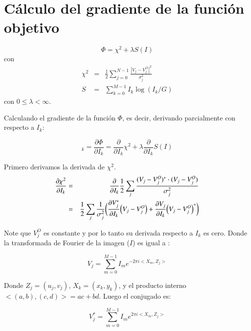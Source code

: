 \chapter{Cálculo del gradiente de la función objetivo}
\label{apendice:dphi}
\begin{equation}
\Phi = \chi^2 + \lambda S(I)
\end{equation}
con
\begin{eqnarray}
\chi^2 & = & \frac{1}{2}\sum^{N-1}_{j=0}{\frac{|V_{j} - V_{j}^{O}|^{2}}{\sigma_j^{2}}} \\
S & = & \sum^{M-1}_{k=0}{I_{k}\log{(I_{k}/G)}}
\end{eqnarray}
con $0 \leq \lambda < \infty$.

Calculando el gradiente de la función $\Phi$, es decir, derivando parcialmente con respecto a $I_{k}$:

\begin{equation}
[\nabla\Phi]_k = \frac{\partial \Phi}{\partial I_{k}} = \frac{\partial}{\partial I_{k}} \chi^{2} + \lambda \frac{\partial}{\partial I_{k}}S(I)
\label{eq:fina}
\end{equation}



Primero derivamos la derivada de $\chi^2$.
\begin{eqnarray}
\frac{\partial\chi^{2}}{\partial I_{k}} & = & \frac{\partial}{\partial I_{k}}\frac{1}{2}\sum\limits_{j}\frac{(V_{j} - V_{j}^{O})^{*}\cdot(V_{j} - V_{j}^{O})}{\sigma_{j}^{2}}\\
                                        & = & \frac{1}{2}\sum\limits_{j}\frac{1}{\sigma_{j}^{2}}\bigg(\frac{\partial
                                         V_{j}^*}{\partial I_{k}}\Bigl( V_{j} - V_{j}^{O}\Bigr)+\frac{\partial V_{j}}{\partial I_{k}}\Bigl(V_{j} - V_{j}^{O}\Bigr)^{*}\biggr)
\end{eqnarray}

Note que $V_j^O$ es constante y por lo tanto su derivada respecto a $I_k$ es cero.
Donde la transformada de Fourier de la imagen ($I$) es igual a :

\begin{equation}
V_{j}=\sum^{M-1}_{m=0}I_{m}e^{-2\pi i<X_m,Z_j>}
\end{equation}

Donde $Z_j=(u_j,v_j)$, $X_k=(x_k,y_k)$, y el producto interno $<(a,b),(c,d)>=ac+bd$. Luego el conjugado es:

\begin{equation}
V_{j}^{*}=\sum^{M-1}_{m=0}I_{m}e^{2\pi i<X_m,Z_j>}
\end{equation}


